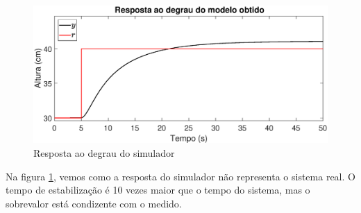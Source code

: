 \begin{figure}[htb]
	\centering
	\includegraphics[width=1\linewidth]{pasta1_figuras/step_simul}
	\caption[Resposta ao degrau do simulador]{Resposta ao degrau do simulador}
	\label{fig:stepsimul}
\end{figure}

Na figura \ref{fig:stepsimul}, vemos como a resposta do simulador não representa o sistema real. O tempo de estabilização é 10 vezes maior que o tempo do sistema, mas o sobrevalor está condizente com o medido.



